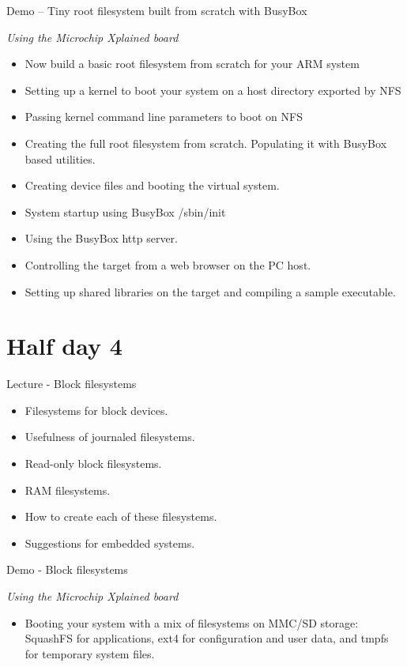 \documentclass[a4paper,12pt,obeyspaces,spaces,hyphens]{article}
\begin{document}
\feagendaonecolumn
{Demo – Tiny root filesystem built from scratch with BusyBox}
{
  {\em Using the Microchip Xplained board}
  \begin{itemize}
  \item Now build a basic root filesystem from scratch for your ARM system
  \item Setting up a kernel to boot your system on a host
        directory exported by NFS
  \item Passing kernel command line parameters to boot on NFS
  \item Creating the full root filesystem from scratch.
        Populating it with BusyBox based utilities.
  \item Creating device files and booting the virtual system.
  \item System startup using BusyBox /sbin/init
  \item Using the BusyBox http server.
  \item Controlling the target from a web browser on the PC host.
  \item Setting up shared libraries on the target and compiling
        a sample executable.
  \end{itemize}
}

\section{Half day 4}

\feagendatwocolumn
{Lecture - Block filesystems}
{
  \begin{itemize}
  \item Filesystems for block devices.
  \item Usefulness of journaled filesystems.
  \item Read-only block filesystems.
  \item RAM filesystems.
  \item How to create each of these filesystems.
  \item Suggestions for embedded systems.
  \end{itemize}
}
{Demo - Block filesystems}
{
  {\em Using the Microchip Xplained board}
  \begin{itemize}
  \item Booting your system with a mix of filesystems on MMC/SD storage: SquashFS for
	applications, ext4 for configuration and user data, and
	tmpfs for temporary system files.
  \end{itemize}
}
\end{document}
